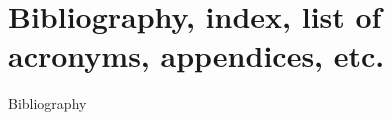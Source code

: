 \documentclass[11pt,a4paper,twoside,openany]{boek3}
\begin{document}


\part{Bibliography, index, list of acronyms, appendices, etc.}

 {Bibliography}



\vfill\pagebreak


\hbox{}\vfill

\closeout\chapterlist
\end{document}
